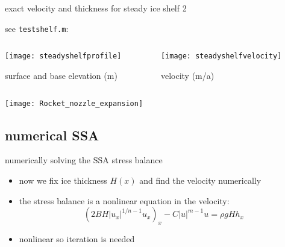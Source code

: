 \begin{frame}{exact velocity and thickness for steady ice shelf 2}

\small see \texttt{testshelf.m}:
\bigskip

\begin{columns}
\begin{column}{0.5\textwidth}
  \texttt{[image: steadyshelfprofile]}

\begin{center}
surface and base elevation (m)
\end{center}
\end{column}
\begin{column}{0.5\textwidth}
  \texttt{[image: steadyshelfvelocity]}

\begin{center}
velocity (m/a)
\end{center}
\end{column}
\end{columns}

\vspace{10mm}
\texttt{[image: Rocket\_nozzle\_expansion]}
\end{frame}


\subsection{numerical SSA}

\begin{frame}{numerically solving the SSA stress balance}

\begin{itemize}
\item now we fix ice thickness $H(x)$ and find the velocity numerically
\item the stress balance is a nonlinear equation in the velocity:
  $$\left(2 B H |u_x|^{1/n - 1} u_x\right)_x - C|u|^{m-1}u = \rho g H h_x$$
\item nonlinear so \alert{iteration is needed}
\end{itemize}
\end{frame}


